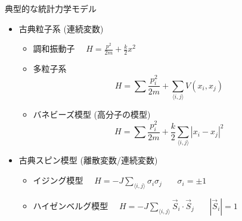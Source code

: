 
\begin{frame}[t,fragile]{典型的な統計力学モデル}
  \begin{itemize}
  \item 古典粒子系 (連続変数)
    \begin{itemize}
    \item 調和振動子 \ \ $\displaystyle H = \frac{p^2}{2m} + \frac{k}{2}x^2$
    \item 多粒子系
      \[
      H = \sum \frac{p_i^2}{2m} + \sum_{\langle i,j \rangle} V(x_i, x_j)
      \]
    \item バネビーズ模型 (高分子の模型)
      \[
      H = \sum \frac{p_i^2}{2m} + \frac{k}{2} \sum_{\langle i,j \rangle} |x_i-x_j|^2
      \]
  \end{itemize}
  \item 古典スピン模型 (離散変数/連続変数)
    \begin{itemize}
    \item イジング模型 \ \ $\displaystyle H = -J \sum_{\langle i,j \rangle} \sigma_i \sigma_j$ \ \ \ $\sigma_i = \pm 1$
    \item ハイゼンベルグ模型 \ \ $\displaystyle H = -J \sum_{\langle i,j \rangle} \vec{S}_i \cdot \vec{S}_j$ \ \ \ $|\vec{S}_i| = 1$
    \end{itemize}
  \end{itemize}
\end{frame}
